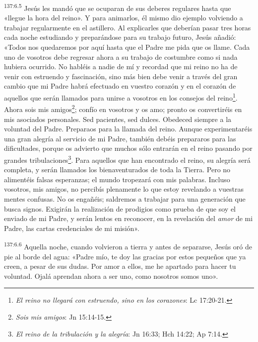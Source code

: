 \par 
\textsuperscript{137:6.5} Jesús les mandó que se ocuparan de sus deberes regulares hasta que «llegue la hora del reino». Y para animarlos, él mismo dio ejemplo volviendo a trabajar regularmente en el astillero. Al explicarles que deberían pasar tres horas cada noche estudiando y preparándose para su trabajo futuro, Jesús añadió: «Todos nos quedaremos por aquí hasta que el Padre me pida que os llame. Cada uno de vosotros debe regresar ahora a su trabajo de costumbre como si nada hubiera ocurrido. No habléis a nadie de mí y recordad que mi reino no ha de venir con estruendo y fascinación, sino más bien debe venir a través del gran cambio que mi Padre habrá efectuado en vuestro corazón y en el corazón de aquellos que serán llamados para unirse a vosotros en los consejos del reino\footnote{\textit{El reino no llegará con estruendo, sino en los corazones}: Lc 17:20-21.}. Ahora sois mis amigos\footnote{\textit{Sois mis amigos}: Jn 15:14-15.}; confío en vosotros y os amo; pronto os convertiréis en mis asociados personales. Sed pacientes, sed dulces. Obedeced siempre a la voluntad del Padre. Preparaos para la llamada del reino. Aunque experimentaréis una gran alegría al servicio de mi Padre, también debéis prepararos para las dificultades, porque os advierto que muchos sólo entrarán en el reino pasando por grandes tribulaciones\footnote{\textit{El reino de la tribulación y la alegría}: Jn 16:33; Hch 14:22; Ap 7:14.}. Para aquellos que han encontrado el reino, su alegría será completa, y serán llamados los bienaventurados de toda la Tierra. Pero no alimentéis falsas esperanzas; el mundo tropezará con mis palabras. Incluso vosotros, mis amigos, no percibís plenamente lo que estoy revelando a vuestras mentes confusas. No os engañéis; saldremos a trabajar para una generación que busca signos. Exigirán la realización de prodigios como prueba de que soy el enviado de mi Padre, y serán lentos en reconocer, en la revelación del \textit{amor} de mi Padre, las cartas credenciales de mi misión».

\par 
\textsuperscript{137:6.6} Aquella noche, cuando volvieron a tierra y antes de separarse, Jesús oró de pie al borde del agua: «Padre mío, te doy las gracias por estos pequeños que ya creen, a pesar de sus dudas. Por amor a ellos, me he apartado para hacer tu voluntad. Ojalá aprendan ahora a ser uno, como nosotros somos uno».

